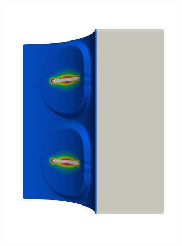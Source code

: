 \begin{frame}
\begin{columns}[T]
\begin{column}{0.6\textwidth}
\begin{figure}
{\begin{subfigure}{0.19\textwidth}
            \includegraphics[width=\textwidth]{examples/figures/seed_ep_6}
          \end{subfigure}
        }
        

\end{figure}
\end{column}
\end{columns}
\end{frame}
